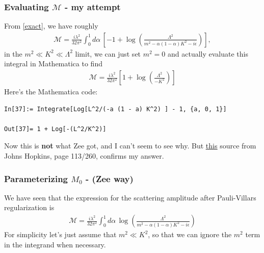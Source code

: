 \documentclass{book}
\theoremstyle{definition}
\newcommand{\f}[2]{\frac{#1}{#2}}
\newcommand{\lp}{\left(}
\newcommand{\rp}{\right)}
\newcommand{\lb}{\left[}
\newcommand{\rb}{\right]}
\begin{document}
\subsubsection{Evaluating $\mathcal{M}$ - my attempt}

From \eqref{exact}, we have roughly
\begin{align}
\mathcal{M}  = \f{i\lambda^2}{32\pi^2} \int^1_0 d\alpha\,\lb -1 + \log\lp \f{\Lambda^2}{m^2  - \alpha(1 - \alpha)K^2 - i\epsilon} \rp \rb,
\end{align}
in the $m^2 \ll K^2 \ll \Lambda^2$ limit, we can just set $m^2 = 0$ and actually evaluate this integral in Mathematica to find
\begin{align}
\boxed{\mathcal{M} = \f{i\lambda^2}{32\pi^2} \lb 1 + \log\lp \f{\Lambda^2}{-K^2}\rp \rb}
\end{align}
Here's the Mathematica code:
\begin{lstlisting}
In[37]:= Integrate[Log[L^2/(-a (1 - a) K^2) ] - 1, {a, 0, 1}]

Out[37]= 1 + Log[-(L^2/K^2)]
\end{lstlisting}


Now this is \textbf{not} what Zee got, and I can't seem to see why. But \href{http://sites.krieger.jhu.edu/jared-kaplan/files/2016/05/QFTNotes.pdf}{\underline{this}} source from Johns Hopkins, page 113/260, confirms my answer.  
















\subsubsection{Parameterizing $M_0$ - (Zee way)}

We have seen that the expression for the scattering amplitude after Pauli-Villars regularization is
\begin{align}
\mathcal{M}  = \f{i\lambda^2}{32\pi^2} \int^1_0 d\alpha\,  \log\lp \f{\Lambda^2}{m^2  - \alpha(1 - \alpha)K^2 - i\epsilon} \rp 
\end{align}
For simplicity let's just assume that $m^2 \ll K^2$, so that we can ignore the $m^2$ term in the integrand when necessary. \\
\end{document}
